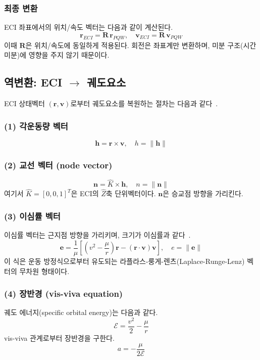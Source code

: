 \documentclass[11pt]{article}
\begin{document}
\subsubsection{최종 변환}

ECI 좌표에서의 위치/속도 벡터는 다음과 같이 계산된다.
\[
  \mathbf{r}_{ECI} = \mathbf{R} \, \mathbf{r}_{PQW}, \quad \mathbf{v}_{ECI} = \mathbf{R} \, \mathbf{v}_{PQW}
\]
이때 $\mathbf{R}$은 위치/속도에 동일하게 적용된다. 회전은 좌표계만 변환하며, 미분 구조(시간 미분)에 영향을 주지 않기 때문이다.

\subsection{역변환: ECI $\to$ 궤도요소}

ECI 상태벡터 $(\mathbf{r}, \mathbf{v})$로부터 궤도요소를 복원하는 절차는 다음과 같다~\cite{Vallado2013, Curtis2020}.

\subsubsection*{(1) 각운동량 벡터}
\[
  \mathbf{h} = \mathbf{r} \times \mathbf{v}, \quad h = \|\mathbf{h}\|
\]

\subsubsection*{(2) 교선 벡터 (node vector)}
\[
  \mathbf{n} = \hat{K} \times \mathbf{h}, \quad n = \|\mathbf{n}\|
\]
여기서 $\hat{K} = [0, 0, 1]^T$은 ECI의 $\hat{Z}$축 단위벡터이다. $\mathbf{n}$은 승교점 방향을 가리킨다.

\subsubsection*{(3) 이심률 벡터}

이심률 벡터는 근지점 방향을 가리키며, 크기가 이심률과 같다~\cite{Battin1999}.
\[
  \mathbf{e} = \frac{1}{\mu}\left[\left(v^2 - \frac{\mu}{r}\right)\mathbf{r} - (\mathbf{r} \cdot \mathbf{v})\mathbf{v}\right], \quad e = \|\mathbf{e}\|
\]
이 식은 운동 방정식으로부터 유도되는 라플라스-룽게-렌츠(Laplace-Runge-Lenz) 벡터의 무차원 형태이다.

\subsubsection*{(4) 장반경 (vis-viva equation)}

궤도 에너지(specific orbital energy)는 다음과 같다.
\[
  \mathcal{E} = \frac{v^2}{2} - \frac{\mu}{r}
\]
vis-viva 관계로부터 장반경을 구한다.
\[
  a = -\frac{\mu}{2\mathcal{E}}
\]
\end{document}

